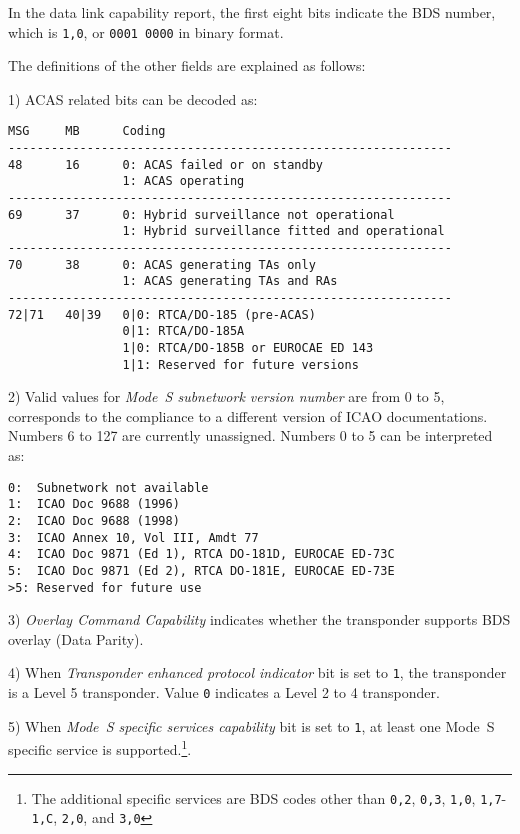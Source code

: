 In the data link capability report, the first eight bits indicate the BDS number, which is \texttt{1,0}, or \texttt{0001 0000} in binary format. 

The definitions of the other fields are explained as follows:

1) ACAS related bits can be decoded as:

\begin{verbatim}
MSG     MB      Coding
--------------------------------------------------------------
48      16      0: ACAS failed or on standby
                1: ACAS operating
--------------------------------------------------------------
69      37      0: Hybrid surveillance not operational
                1: Hybrid surveillance fitted and operational
--------------------------------------------------------------
70      38      0: ACAS generating TAs only
                1: ACAS generating TAs and RAs
--------------------------------------------------------------
72|71   40|39   0|0: RTCA/DO-185 (pre-ACAS)
                0|1: RTCA/DO-185A
                1|0: RTCA/DO-185B or EUROCAE ED 143
                1|1: Reserved for future versions
\end{verbatim}

2) Valid values for \emph{Mode~S subnetwork version number} are from 0 to 5, corresponds to the compliance to a different version of ICAO documentations. Numbers 6 to 127 are currently unassigned. Numbers 0 to 5 can be interpreted as:

\begin{verbatim}
0:  Subnetwork not available
1:  ICAO Doc 9688 (1996)
2:  ICAO Doc 9688 (1998)
3:  ICAO Annex 10, Vol III, Amdt 77
4:  ICAO Doc 9871 (Ed 1), RTCA DO-181D, EUROCAE ED-73C
5:  ICAO Doc 9871 (Ed 2), RTCA DO-181E, EUROCAE ED-73E
>5: Reserved for future use
\end{verbatim}

3) \emph{Overlay Command Capability} indicates whether the transponder supports BDS overlay (Data Parity).

4) When \emph{Transponder enhanced protocol indicator} bit is set to \texttt{1}, the transponder is a Level 5 transponder. Value \texttt{0} indicates a Level 2 to 4 transponder.

5) When \emph{Mode~S specific services capability} bit is set to \texttt{1}, at least one Mode~S specific service is supported.\footnote{The additional specific services are BDS codes other than \texttt{0,2}, \texttt{0,3}, \texttt{1,0}, \texttt{1,7}-\texttt{1,C}, \texttt{2,0}, and \texttt{3,0}}.


